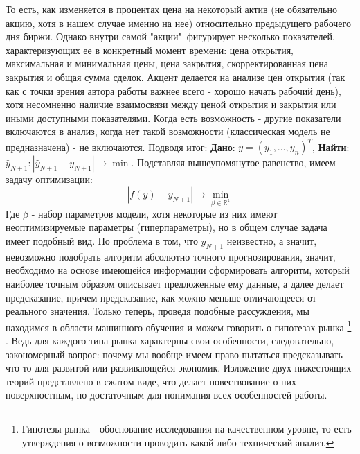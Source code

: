 		То есть, как изменяется в процентах цена на некоторый актив (не обязательно акцию, хотя в нашем случае именно на нее) относительно предыдущего рабочего дня биржи. Однако внутри самой "акции"\ фигурирует несколько показателей, характеризующих ее в конкретный момент времени: цена открытия, максимальная и минимальная цены, цена закрытия, скорректированная цена закрытия и общая сумма сделок. Акцент делается на анализе цен открытия (так как с точки зрения автора работы важнее всего - хорошо начать рабочий день), хотя несомненно наличие взаимосвязи между ценой открытия и закрытия или иными доступными показателями. Когда есть возможность - другие показатели включаются в анализ, когда нет такой возможности (классическая модель не предназначена) - не включаются. Подводя итог: \textbf{Дано}: $y = \left(y_1, \ldots, y_n\right)^T$, \textbf{Найти}: $\hat{y}_{N + 1}: |\hat{y}_{N + 1} - y_{N + 1}| \to \min$. Подставляя вышеупомянутое равенство, имеем задачу оптимизации:
		\begin{equation}
			|f(y) - y_{N + 1}| \to \min_{\beta \in \mathbb{R}^k}
		\end{equation}
		Где $\beta$ - набор параметров модели, хотя некоторые из них имеют неоптимизируемые параметры (гиперпараметры), но в общем случае задача имеет подобный вид. Но проблема в том, что $y_{N + 1}$ неизвестно, а значит, невозможно подобрать алгоритм абсолютно точного прогнозирования, значит, необходимо на основе имеющейся информации сформировать алгоритм, который наиболее точным образом описывает предложенные ему данные, а далее делает предсказание, причем предсказание, как можно меньше отличающееся от реального значения. Только теперь, проведя подобные рассуждения, мы находимся в области машинного обучения и можем говорить о гипотезах рынка \footnote{Гипотезы рынка - обоснование исследования на качественном уровне, то есть утверждения о возможности проводить какой-либо технический анализ.} . Ведь для каждого типа рынка характерны свои особенности, следовательно, закономерный вопрос: почему мы вообще имеем право пытаться предсказывать что-то для развитой или развивающейся экономик. Изложение двух нижестоящих теорий представлено в сжатом виде, что делает повествование о них поверхностным, но достаточным для понимания всех особенностей работы.
